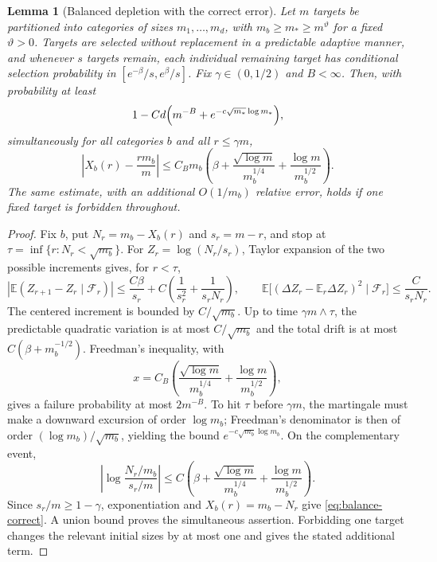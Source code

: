 \documentclass[11pt]{article}
\newcommand{\E}{\mathbb E}
\newcommand{\1}{\mathbf 1}
\newcommand{\cF}{\mathcal F}
\newtheorem{lemma}[theorem]{Lemma}
\theoremstyle{remark}
\begin{document}
\begin{lemma}[Balanced depletion with the correct error]\label{lem:balance-correct}
Let $m$ targets be partitioned into categories of sizes $m_1,\dots,m_d$,
with $m_b\ge m_*\ge m^\vartheta$ for a fixed $\vartheta>0$.  Targets are
selected without replacement in a predictable adaptive manner, and whenever
$s$ targets remain, each individual remaining target has conditional
selection probability in $[e^{-\beta}/s,e^\beta/s]$.  Fix
$\gamma\in(0,1/2)$ and $B<\infty$.  Then, with probability at least
\[
 1-Cd\Bigl(m^{-B}+e^{-c\sqrt{m_*}\log m_*}\Bigr),
\]
simultaneously for all categories $b$ and all $r\le\gamma m$,
\begin{equation}\label{eq:balance-correct}
 \left|X_b(r)-\frac{rm_b}{m}\right|
 \le C_Bm_b\left(
 \beta+\frac{\sqrt{\log m}}{m_b^{1/4}}
       +\frac{\log m}{m_b^{1/2}}
 \right).
\end{equation}
The same estimate, with an additional $O(1/m_b)$ relative error, holds if one
fixed target is forbidden throughout.
\end{lemma}

\begin{proof}
Fix $b$, put $N_r=m_b-X_b(r)$ and $s_r=m-r$, and stop at
$\tau=\inf\{r:N_r<\sqrt{m_b}\}$.  For
$Z_r=\log(N_r/s_r)$, Taylor expansion of the two possible increments gives,
for $r<\tau$,
\[
 \left|\E(Z_{r+1}-Z_r\mid\cF_r)\right|
 \le \frac{C\beta}{s_r}+C\left(\frac1{s_r^2}+\frac1{s_rN_r}\right),
 \qquad
 \E\bigl[(\Delta Z_r-\E_r\Delta Z_r)^2\mid\cF_r\bigr]
 \le\frac{C}{s_rN_r}.
\]
The centered increment is bounded by $C/\sqrt{m_b}$.  Up to time
$\gamma m\wedge\tau$, the predictable quadratic variation is at most
$C/\sqrt{m_b}$ and the total drift is at most
$C(\beta+m_b^{-1/2})$.  Freedman's inequality, with
\[
 x=C_B\left(\frac{\sqrt{\log m}}{m_b^{1/4}}
             +\frac{\log m}{m_b^{1/2}}\right),
\]
gives a failure probability at most $2m^{-B}$.  To hit $\tau$ before
$\gamma m$, the martingale must make a downward excursion of order
$\log m_b$; Freedman's denominator is then of order
$(\log m_b)/\sqrt{m_b}$, yielding the bound
$e^{-c\sqrt{m_b}\log m_b}$.  On the complementary event,
\[
 \left|\log\frac{N_r/m_b}{s_r/m}\right|
 \le C\left(\beta+\frac{\sqrt{\log m}}{m_b^{1/4}}
                   +\frac{\log m}{m_b^{1/2}}\right).
\]
Since $s_r/m\ge1-\gamma$, exponentiation and
$X_b(r)=m_b-N_r$ give \eqref{eq:balance-correct}.  A union bound proves the
simultaneous assertion.  Forbidding one target changes the relevant initial
sizes by at most one and gives the stated additional term.
\end{proof}
\end{document}
